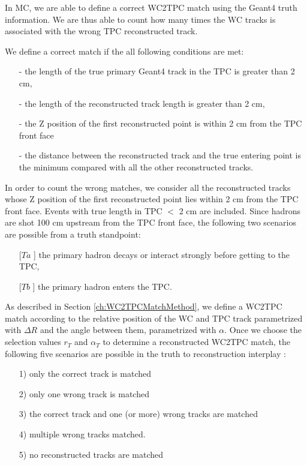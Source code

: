 In MC, we are able to define a correct WC2TPC match using the Geant4 truth information. We are thus able to count how many times the WC tracks is associated with the wrong TPC reconstructed track. 

We define a correct match if the all following conditions are met:
\begin{itemize}
\item[-] the length of the true primary Geant4 track in the TPC is greater than 2 cm,  
\item[-] the length of the reconstructed track length is greater than 2 cm,
\item[-] the Z position of the first reconstructed point is within 2 cm from the TPC front face
\item[-] the distance between the reconstructed track and the true entering point is the minimum compared with all the other reconstructed tracks.
\end{itemize}

In order to count the wrong matches, we consider all the reconstructed tracks whose Z position of the first reconstructed point lies within 2 cm from the TPC front face. Events with true length in TPC $<$ 2 cm are included. 
Since hadrons are shot 100 cm upstream from the TPC front face, the following two scenarios are possible from a truth standpoint: 
\begin{itemize}
\item[[$Ta$]] the primary hadron decays or interact strongly before getting to the TPC,
\item[[$Tb$]] the primary hadron enters the TPC.
\end{itemize}

As described in Section \ref{ch:WC2TPCMatchMethod}, we define a WC2TPC match according to the relative position of the WC and TPC track parametrized with $\Delta R$ and the angle between them, parametrized with $\alpha$. Once we choose the selection values $r_{T}$ and $\alpha_{T}$ to determine a reconstructed WC2TPC match, the following five scenarios are possible in the truth to reconstruction interplay : 
\begin{itemize}
\item[1)] only the correct track is matched
\item[2)] only one wrong track is matched 
\item[3)] the correct track and one (or more) wrong tracks are matched
\item[4)] multiple wrong tracks  matched.
\item[5)] no reconstructed tracks are matched
\end{itemize}

